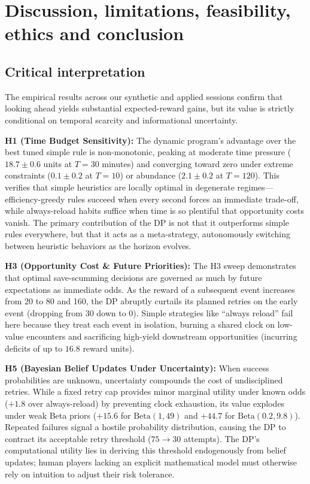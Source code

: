 \documentclass[11pt,a4paper]{article}
\newcommand{\who}[1]{}
\begin{document}
\section{Discussion, limitations, feasibility, ethics and conclusion\who{Yusif}}
\label{sec:discussion}

\subsection{Critical interpretation}
The empirical results across our synthetic and applied sessions confirm that looking ahead yields substantial expected-reward gains, but its value is strictly conditional on temporal scarcity and informational uncertainty. 

\textbf{H1 (Time Budget Sensitivity):} The dynamic program's advantage over the best tuned simple rule is non-monotonic, peaking at moderate time pressure ($18.7 \pm 0.6$ units at $T = 30$ minutes) and converging toward zero under extreme constraints ($0.1 \pm 0.2$ at $T = 10$) or abundance ($2.1 \pm 0.2$ at $T = 120$). This verifies that simple heuristics are locally optimal in degenerate regimes—efficiency-greedy rules succeed when every second forces an immediate trade-off, while always-reload habits suffice when time is so plentiful that opportunity costs vanish. The primary contribution of the DP is not that it outperforms simple rules everywhere, but that it acts as a meta-strategy, autonomously switching between heuristic behaviors as the horizon evolves.

\textbf{H3 (Opportunity Cost \& Future Priorities):} The H3 sweep demonstrates that optimal save-scumming decisions are governed as much by future expectations as immediate odds. As the reward of a subsequent event increases from 20 to 80 and 160, the DP abruptly curtails its planned retries on the early event (dropping from 30 down to 0). Simple strategies like ``always reload'' fail here because they treat each event in isolation, burning a shared clock on low-value encounters and sacrificing high-yield downstream opportunities (incurring deficits of up to $16.8$ reward units). 

\textbf{H5 (Bayesian Belief Updates Under Uncertainty):} When success probabilities are unknown, uncertainty compounds the cost of undisciplined retries. While a fixed retry cap provides minor marginal utility under known odds ($+1.8$ over always-reload) by preventing clock exhaustion, its value explodes under weak Beta priors ($+15.6$ for $\mathrm{Beta}(1,49)$ and $+44.7$ for $\mathrm{Beta}(0.2,9.8)$). Repeated failures signal a hostile probability distribution, causing the DP to contract its acceptable retry threshold ($75 \to 30$ attempts). The DP's computational utility lies in deriving this threshold endogenously from belief updates; human players lacking an explicit mathematical model must otherwise rely on intuition to adjust their risk tolerance.
\end{document}

